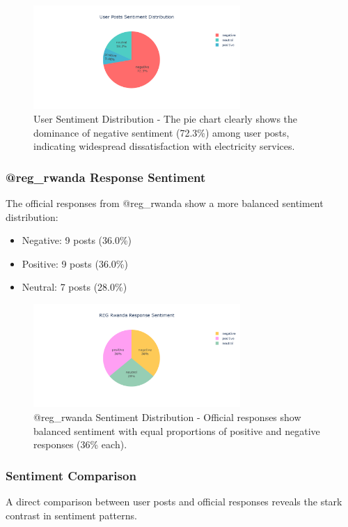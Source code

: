\documentclass[a4paper,12pt]{article}
\begin{document}
	\begin{figure}[H]
		\centering
		\includegraphics[width=0.7\textwidth]{../results/user_sentiment_distribution.png}
		\caption{User Sentiment Distribution - The pie chart clearly shows the dominance of negative sentiment (72.3\%) among user posts, indicating widespread dissatisfaction with electricity services.}
		\label{fig:user_sentiment}
	\end{figure}
	
	\subsubsection{@reg\_rwanda Response Sentiment}
	The official responses from @reg\_rwanda show a more balanced sentiment distribution:
	\begin{itemize}
		\item Negative: 9 posts (36.0\%)
		\item Positive: 9 posts (36.0\%)
		\item Neutral: 7 posts (28.0\%)
	\end{itemize}
	
	\begin{figure}[H]
		\centering
		\includegraphics[width=0.7\textwidth]{../results/reg_sentiment_distribution.png}
		\caption{@reg\_rwanda Sentiment Distribution - Official responses show balanced sentiment with equal proportions of positive and negative responses (36\% each).}
		\label{fig:reg_sentiment}
	\end{figure}
	
	\subsubsection{Sentiment Comparison}
	A direct comparison between user posts and official responses reveals the stark contrast in sentiment patterns.
	
\end{document}
